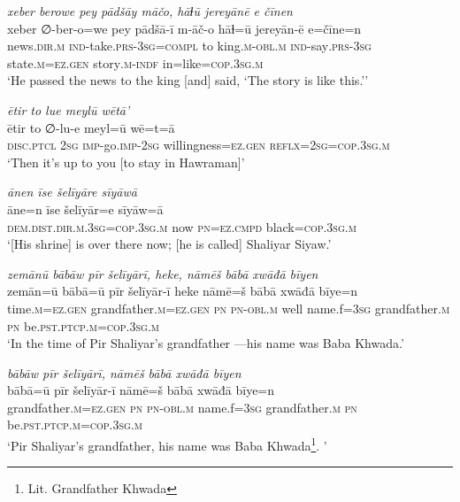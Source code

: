 \ea \label{ŽP.259}
\textit{xeber berowe pey pādšāy māčo, hāɫū jereyānē e čīnen} \\ 
\gll xeber ∅-ber-o=we pey pādšā-ī m-āč-o hāɫ=ū jereyān-ē e=čīne=n \\ 
 news\textsc{.dir}\textsc{.m} \textsc{ind-}take\textsc{.prs}\textsc{-3sg}\textsc{=compl} to king\textsc{.m}\textsc{-obl}\textsc{.m} \textsc{ind-}say\textsc{.prs}\textsc{-3sg} state\textsc{.m}\textsc{\textsc{=ez.gen}} story\textsc{.m}\textsc{-indf} in=like\textsc{=cop}\textsc{.3sg}\textsc{.m} \\ 
\glt `He passed the news to the king [and] said, ‘The story is like this.’'
\z 
 
\ea \label{ŽP.263}
\textit{ētir to lue meylū wētā’} \\ 
\gll ētir to ∅-lu-e meyl=ū wē=t=ā \\ 
 \textsc{disc.ptcl} \textsc{2sg} \textsc{imp-}go.\textsc{imp-}\textsc{2sg} willingness\textsc{\textsc{=ez.gen}} \textsc{reflx}\textsc{=\textsc{2sg}}\textsc{=cop}\textsc{.3sg}\textsc{.m} \\ 
\glt `Then it’s up to you [to stay in Hawraman]'
\z 
 
\ea \label{ŽP.267}
\textit{ānen īse šelīyāre sīyāwā} \\ 
\gll āne=n īse šelīyār=e sīyāw=ā \\ 
 \textsc{dem.dist}\textsc{.dir}\textsc{.m}\textsc{.3sg}\textsc{=cop}\textsc{.3sg}\textsc{.m} now \textsc{pn}\textsc{=ez}\textsc{.cmpd} black\textsc{=cop}\textsc{.3sg}\textsc{.m} \\ 
\glt `[His shrine] is over there now; [he is called] Shaliyar Siyaw.'
\z 
 
\ea \label{BP.1}
\textit{zemānū bābāw pīr šelīyārī, heke, nāmēš bābā xwāđā bīyen} \\ 
\gll zemān=ū bābā=ū pīr šelīyār-ī heke nāmē=š bābā xwāđā bīye=n \\ 
 time\textsc{.m}\textsc{=ez.gen} grandfather\textsc{.m}\textsc{=ez.gen} \textsc{pn} \textsc{pn}\textsc{-obl}\textsc{.m} well name.f\textsc{=3sg} grandfather\textsc{.m} \textsc{pn} be\textsc{.pst}\textsc{.ptcp}\textsc{.m}\textsc{=cop}\textsc{.3sg}\textsc{.m} \\ 
\glt `In the time of Pir Shaliyar’s grandfather —his name was Baba Khwada.'
\z 
 
\ea \label{BP.2}
\textit{bābāw pīr šelīyārī, nāmēš bābā xwāđā bīyen} \\ 
\gll bābā=ū pīr šelīyār-ī nāmē=š bābā xwāđā bīye=n \\ 
 grandfather\textsc{.m}\textsc{=ez.gen} \textsc{pn} \textsc{pn}\textsc{-obl}\textsc{.m} name.f\textsc{=3sg} grandfather\textsc{.m} \textsc{pn} be\textsc{.pst}\textsc{.ptcp}\textsc{.m}\textsc{=cop}\textsc{.3sg}\textsc{.m} \\ 
\glt `Pir Shaliyar’s grandfather, his name was Baba Khwada\footnote{Lit. Grandfather Khwada}. '
\z 
 
